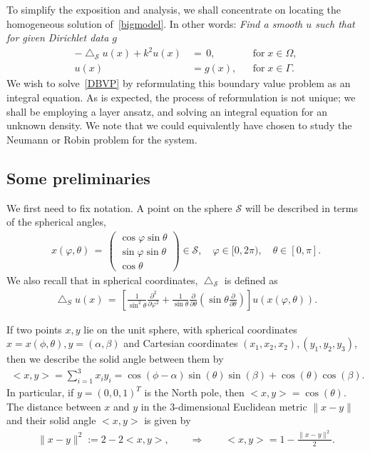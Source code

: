 \documentclass[final]{siamltex}
\newcommand{\lap}{\bigtriangleup}
\renewcommand{\S} {\mathcal{S}}
\begin{document}
To simplify the exposition and analysis, we shall concentrate on
locating the homogeneous solution of~\eqref{bigmodel}.  In other words:
{\it Find a smooth $u$ such that for given Dirichlet data $g$}
\begin{subequations}
  \label{DBVP}
  \begin{align}
    -\lap_{\S} u(x) +k^2u(x)\, &= \, 0, &&\mbox{for} \; 
      x \in { \Omega},\\
    u(x) &= g(x), &&\mbox{for} \; x \in \Gamma.
  \end{align}
\end{subequations}
We wish to solve~\eqref{DBVP} by reformulating this boundary value
problem as an integral equation. As is expected, the process of
reformulation is not unique; we shall be employing a layer ansatz, and
solving an integral equation for an unknown density.  We note that we
could equivalently have chosen to study the Neumann or Robin problem
for the system.


\subsection{Some preliminaries}
We first need to fix notation.  A point on the sphere $\S$ will be
described in terms of the spherical angles,
\begin{align*}
  x(\varphi,\theta) \, = \, \left( 
  \begin{array}{c}
    \cos \varphi \sin \theta \\
    \sin \varphi \sin \theta \\
    \cos \theta
  \end{array} 
  \right) \in{\S}, \quad \varphi \in [0,2\pi), 
    \quad \theta \in [0,\pi].
\end{align*}
We also recall that in spherical coordinates, $\lap_\S$ is defined as
\begin{align*}
  \lap_S u(x) \, = \, \left[
  \frac{1}{\sin^2 \theta} \frac{\partial^2}{\partial \varphi^2} +
  \frac{1}{\sin \theta} \frac{\partial}{\partial \theta}
  \left(\sin \theta \frac{\partial}{ \partial \theta}\right)
  \right] u(x(\varphi,\theta)).
\end{align*}

If two points $x,y$ lie on the unit sphere, with
spherical coordinates $x=x(\phi,\theta), y=(\alpha,\beta)$ and Cartesian coordinates $(x_1,x_2,x_2),(y_1,y_2,y_3)$, then we describe the solid angle between them by \begin{align*}
  <x,y> = \sum_{i=1}^3 x_iy_i=\cos(\phi-\alpha)\sin(\theta)\sin(\beta)+\cos(\theta)\cos(\beta).
\end{align*} In particular, if $y=(0,0,1)^T$ is the North pole, then $<x,y>=\cos(\theta)$. 
The distance between $x$ and $y$ in the 3-dimensional Euclidean metric
$\|x-y\|$ and their solid angle $<x,y> $ is given
by 
\begin{align*}
  \|x-y\|^2:=
  2-2<x,y>, \qquad \Rightarrow \qquad <x,y>= 1-\frac{\|x-y\|^2}{2}.
\end{align*}
\end{document}
